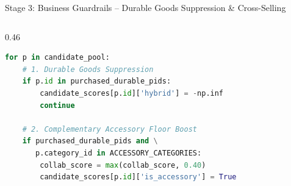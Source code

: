 \documentclass[10pt]{beamer}
\begin{document}
\begin{frame}[fragile]{Stage 3: Business Guardrails -- Durable Goods Suppression \& Cross-Selling}
\begin{columns}[T]
\begin{column}{0.46\textwidth}
\begin{lstlisting}[language=Python]
for p in candidate_pool:
    # 1. Durable Goods Suppression
    if p.id in purchased_durable_pids:
        candidate_scores[p.id]['hybrid'] = -np.inf
        continue

    # 2. Complementary Accessory Floor Boost
    if purchased_durable_pids and \
       p.category_id in ACCESSORY_CATEGORIES:
        collab_score = max(collab_score, 0.40)
        candidate_scores[p.id]['is_accessory'] = True
\end{lstlisting}
    \end{column}
\end{columns}
\end{frame}

\end{document}
